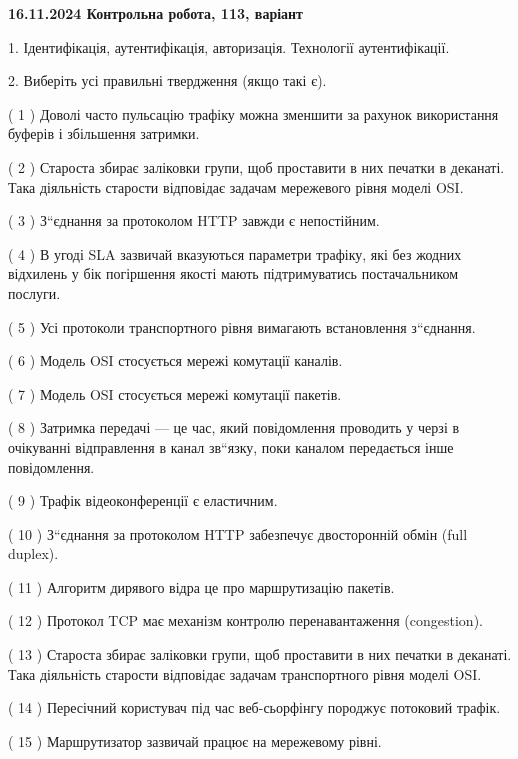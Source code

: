 \documentclass[12pt, ukrainian]{article}
\begin{document}
\vspace{4mm}
\newpage
\begin {large}

\textbf{16.11.2024 Контрольна робота, 113, варіант  }\par


{
1. Ідентифікація, аутентифікація, авторизація. Технології аутентифікації.



\vspace{5mm}
2. Виберіть усі правильні твердження (якщо такі є).\par
\vspace{2mm}

( 1 ) Доволі часто пульсацію трафіку можна зменшити за рахунок використання буферів і збільшення затримки.

( 2 ) Староста збирає заліковки групи, щоб проставити в них печатки в деканаті. Така діяльність старости відповідає задачам мережевого рівня моделі OSI.

( 3 ) З“єднання за протоколом  HTTP завжди є непостійним.

( 4 ) В угоді SLA зазвичай вказуються параметри трафіку, які без жодних відхилень у бік погіршення якості мають підтримуватись постачальником послуги.

( 5 ) Усі протоколи транспортного рівня вимагають встановлення з“єднання.

( 6 ) Модель OSI стосується мережі комутації каналів.

( 7 ) Модель OSI стосується мережі комутації пакетів.

( 8 ) Затримка передачі — це час, який повідомлення проводить у черзі в очікуванні відправлення в канал зв“язку, поки каналом передається інше повідомлення.

( 9 ) Трафік відеоконференції є еластичним.

( 10 ) З“єднання за протоколом  HTTP забезпечує двосторонній обмін (full duplex).

( 11 ) Алгоритм дирявого відра це про маршрутизацію пакетів.

( 12 ) Протокол TCP має механізм контролю перенавантаження (congestion).

( 13 ) Староста збирає заліковки групи, щоб проставити в них печатки в деканаті. Така діяльність старости відповідає задачам транспортного рівня моделі OSI.

( 14 ) Пересічний користувач під час веб-сьорфінгу породжує потоковий трафік.

( 15 ) Маршрутизатор зазвичай працює на мережевому рівні.
}
\end {large}
\end{document}
